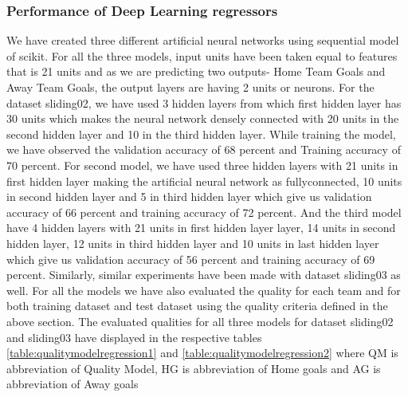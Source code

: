 \subsubsection{Performance of Deep Learning regressors}
We have created three different artificial neural networks using sequential model of scikit. For all the three models, input units have been taken equal to features that is 21 units and as we are predicting two outputs- Home Team Goals and Away Team Goals, the output layers are having 2 units or neurons. For the dataset sliding02, we have used 3 hidden layers from which first hidden layer has 30 units which makes the neural network densely connected with 20 units in the second hidden layer and 10 in the third hidden layer. While training the model, we have observed the validation accuracy of 68 percent and Training accuracy of 70 percent. For second model, we have used three hidden layers with 21 units in first hidden layer making the artificial neural network as fullyconnected, 10 units in second hidden layer and 5 in third hidden layer which give us validation accuracy of 66 percent and training accuracy of 72 percent. And the third model have 4 hidden layers with 21 units in first hidden layer layer, 14 units in second hidden layer, 12 units in third hidden layer and 10 units in last hidden layer which give us validation accuracy of 56 percent and training accuracy of 69 percent.\newline
Similarly, similar experiments have been made with dataset sliding03 as well. For all the models we have also evaluated the quality for each team and for both training dataset and test dataset using the quality criteria defined in the above section. The evaluated qualities for all three models for dataset sliding02 and sliding03 have displayed in the respective tables \autoref{table:qualitymodelregression1} and \autoref{table:qualitymodelregression2} where QM is abbreviation of Quality Model, HG is abbreviation of Home goals and AG is abbreviation of Away goals\newline

\begin{table}
\centering
{}
\caption{ Quality Model for models with different hidden units for dataset sliding02}
\label{table:qualitymodelregression1}
\end{table}



